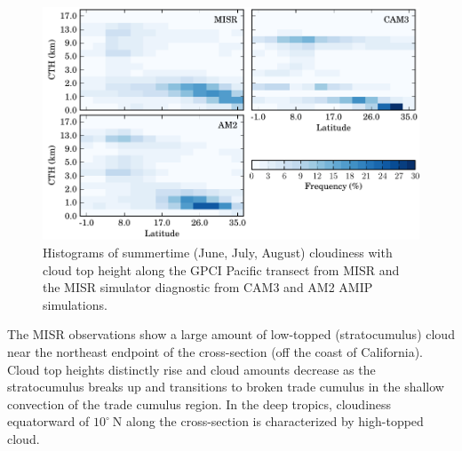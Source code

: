 \begin{figure}
    \centering
    \includegraphics{../graphics/cldcth_cmip3amip_gpci.pdf}
    \caption[Histograms of summertime cloudiness with cloud top height along the GPCI Pacific transect from MISR and the MISR simulator diagnostic from CAM3 and AM2 AMIP simulations.]{Histograms of summertime (June, July, August) cloudiness with cloud top height along the GPCI Pacific transect from MISR and the MISR simulator diagnostic from CAM3 and AM2 AMIP simulations.}
    \label{cldcth_cmip3amip_gpci}
\end{figure}

The MISR observations show a large amount of low-topped (stratocumulus) cloud near the northeast endpoint of the cross-section (off the coast of California). Cloud top heights distinctly rise and cloud amounts decrease as the stratocumulus breaks up and transitions to broken trade cumulus in the shallow convection of the trade cumulus region. In the deep tropics, cloudiness equatorward of $10^\circ~\text{N}$ along the cross-section is characterized by high-topped cloud.


